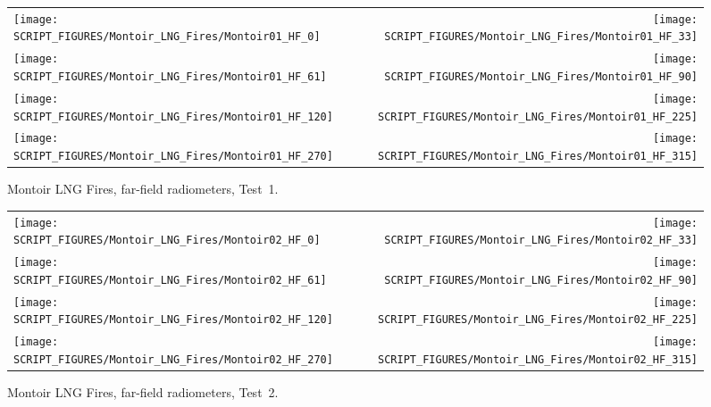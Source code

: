 \newpage

\begin{figure}[p]
\begin{tabular*}{\textwidth}{l@{\extracolsep{\fill}}r}
\texttt{[image: SCRIPT\_FIGURES/Montoir\_LNG\_Fires/Montoir01\_HF\_0]} &
\texttt{[image: SCRIPT\_FIGURES/Montoir\_LNG\_Fires/Montoir01\_HF\_33]} \\
\texttt{[image: SCRIPT\_FIGURES/Montoir\_LNG\_Fires/Montoir01\_HF\_61]} &
\texttt{[image: SCRIPT\_FIGURES/Montoir\_LNG\_Fires/Montoir01\_HF\_90]} \\
\texttt{[image: SCRIPT\_FIGURES/Montoir\_LNG\_Fires/Montoir01\_HF\_120]} &
\texttt{[image: SCRIPT\_FIGURES/Montoir\_LNG\_Fires/Montoir01\_HF\_225]} \\
\texttt{[image: SCRIPT\_FIGURES/Montoir\_LNG\_Fires/Montoir01\_HF\_270]} &
\texttt{[image: SCRIPT\_FIGURES/Montoir\_LNG\_Fires/Montoir01\_HF\_315]}
\end{tabular*}
\caption[Montoir LNG Fires, far-field radiometers, Test~1]{Montoir LNG Fires, far-field radiometers, Test~1.}
\label{Montoir_HF_1}
\end{figure}

\begin{figure}[p]
\begin{tabular*}{\textwidth}{l@{\extracolsep{\fill}}r}
\texttt{[image: SCRIPT\_FIGURES/Montoir\_LNG\_Fires/Montoir02\_HF\_0]} &
\texttt{[image: SCRIPT\_FIGURES/Montoir\_LNG\_Fires/Montoir02\_HF\_33]} \\
\texttt{[image: SCRIPT\_FIGURES/Montoir\_LNG\_Fires/Montoir02\_HF\_61]} &
\texttt{[image: SCRIPT\_FIGURES/Montoir\_LNG\_Fires/Montoir02\_HF\_90]} \\
\texttt{[image: SCRIPT\_FIGURES/Montoir\_LNG\_Fires/Montoir02\_HF\_120]} &
\texttt{[image: SCRIPT\_FIGURES/Montoir\_LNG\_Fires/Montoir02\_HF\_225]} \\
\texttt{[image: SCRIPT\_FIGURES/Montoir\_LNG\_Fires/Montoir02\_HF\_270]} &
\texttt{[image: SCRIPT\_FIGURES/Montoir\_LNG\_Fires/Montoir02\_HF\_315]}
\end{tabular*}
\caption[Montoir LNG Fires, far-field radiometers, Test~2]{Montoir LNG Fires, far-field radiometers, Test~2.}
\label{Montoir_HF_2}
\end{figure}

